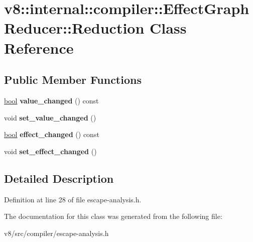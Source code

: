 \hypertarget{classv8_1_1internal_1_1compiler_1_1EffectGraphReducer_1_1Reduction}{}\section{v8\+:\+:internal\+:\+:compiler\+:\+:Effect\+Graph\+Reducer\+:\+:Reduction Class Reference}
\label{classv8_1_1internal_1_1compiler_1_1EffectGraphReducer_1_1Reduction}
\subsection*{Public Member Functions}
\begin{DoxyCompactItemize}
\item 
\mbox{\label{classv8_1_1internal_1_1compiler_1_1EffectGraphReducer_1_1Reduction_a04f90a9ca70463a0d9695e3f86f0c7fc}} 
\mbox{\hyperlink{classbool}{bool}} {\bfseries value\+\_\+changed} () const
\item 
\mbox{\label{classv8_1_1internal_1_1compiler_1_1EffectGraphReducer_1_1Reduction_a804f4392e9814cccadac8661050615ca}} 
void {\bfseries set\+\_\+value\+\_\+changed} ()
\item 
\mbox{\label{classv8_1_1internal_1_1compiler_1_1EffectGraphReducer_1_1Reduction_a2c94b5e4373ffa95b07c8bb5e192c3c0}} 
\mbox{\hyperlink{classbool}{bool}} {\bfseries effect\+\_\+changed} () const
\item 
\mbox{\label{classv8_1_1internal_1_1compiler_1_1EffectGraphReducer_1_1Reduction_aa5e94475b4aba47946f1aeab3c88bcb4}} 
void {\bfseries set\+\_\+effect\+\_\+changed} ()
\end{DoxyCompactItemize}


\subsection{Detailed Description}


Definition at line 28 of file escape-\/analysis.\+h.



The documentation for this class was generated from the following file\+:\begin{DoxyCompactItemize}
\item 
v8/src/compiler/escape-\/analysis.\+h\end{DoxyCompactItemize}
